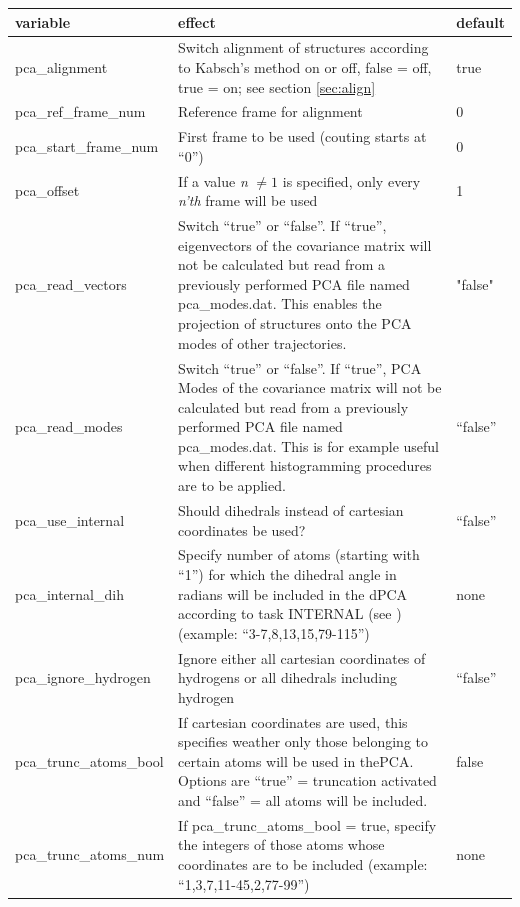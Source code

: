 \documentclass[10pt,a4paper]{article} %
\begin{document}
	\begin{longtable}{|p{3.5cm}|p{5cm}|p{2.5cm}|}
		variable & effect & default\\
		\hline
		pca\_alignment & Switch alignment of structures according to Kabsch's method\cite{kabsch1, kabsch2} on or off, false = off, true = on; see section \ref{sec:align} & true\\
		pca\_ref\_frame\_num & Reference frame for alignment & 0 \\
		pca\_start\_frame\_num & First frame to be used (couting starts at ``0'') & 0 \\
		pca\_offset & If a value \textit{n} $\neq 1$ is specified, only every \textit{n'th} frame will be used & 1 \\
		pca\_read\_vectors & Switch ``true'' or ``false''. If ``true'', eigenvectors of the covariance matrix will not be calculated but read from a previously performed \ac{PCA} file named \glqq pca\_modes.dat\grqq. This enables the projection of structures onto the \ac{PCA} modes of other trajectories. & "false" \\
		pca\_read\_modes & Switch ``true'' or ``false''. If ``true'', \ac{PCA} Modes of the covariance matrix will not be calculated but read from a previously performed \ac{PCA} file named \glqq pca\_modes.dat\grqq. This is for example useful when different histogramming procedures are to be applied. & ``false'' \\
		pca\_use\_internal & Should dihedrals instead of cartesian coordinates be used? & ``false''\\
		pca\_internal\_dih & Specify number of atoms (starting with ``1'') for which the dihedral angle in radians will be included in the dPCA according to task INTERNAL (see \cite{dpca1, dpca2, dpca3}) (example: ``3-7,8,13,15,79-115'') & none\\
		pca\_ignore\_hydrogen & Ignore either all cartesian coordinates of hydrogens or all dihedrals including hydrogen & ``false'' \\
		pca\_trunc\_atoms\_bool & If cartesian coordinates are used, this specifies weather only those belonging to certain atoms will be used in the\ac{PCA}. Options are ``true'' = truncation activated and ``false'' = all atoms will be included. & false\\
		pca\_trunc\_atoms\_num & If pca\_trunc\_atoms\_bool = true, specify the integers of those atoms whose coordinates are to be included (example: ``1,3,7,11-45,2,77-99'') & none\\
		\end{longtable}
\end{document}

